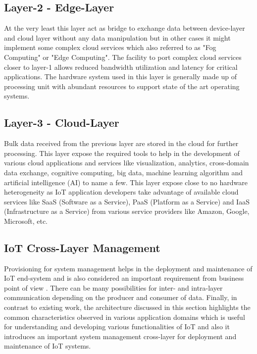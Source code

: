 \documentclass{article}
\begin{document}
\subsection{Layer-2 - Edge-Layer}

At the very least this layer act as bridge to exchange data between device-layer and cloud layer without any data manipulation but in other cases it might implement some complex cloud services which also referred to as "Fog Computing" or "Edge Computing".
The facility to port complex cloud services closer to layer-1 allows reduced bandwidth utilization and latency for critical applications.
The hardware system used in this layer is generally made up of processing unit with abundant resources to support state of the art operating systems.

\subsection{Layer-3 - Cloud-Layer}

Bulk data received from the previous layer are stored in the cloud for further processing.
This layer expose the required tools to help in the development of various cloud applications and services like visualization, analytics, cross-domain data exchange, cognitive computing, big data, machine learning algorithm and artificial intelligence (AI) to name a few.
This layer expose close to no hardware heterogeneity as IoT application developers take advantage of available cloud services like SaaS (Software as a Service), PaaS (Platform as a Service) and IaaS (Infrastructure as a Service) from various service providers like Amazon, Google, Microsoft, etc.

\subsection{IoT Cross-Layer Management}

Provisioning for system management helps in the deployment and maintenance of IoT end-system and is also considered an important requirement from business point of view .
There can be many possibilities for inter- and intra-layer communication depending on the producer and consumer of data.
Finally, in contrast to existing work, the architecture discussed in this section highlights the common characteristics observed in various application domains which is useful for understanding and developing various functionalities of IoT and also it introduces an important system management cross-layer for deployment and maintenance of IoT systems.
\end{document}
